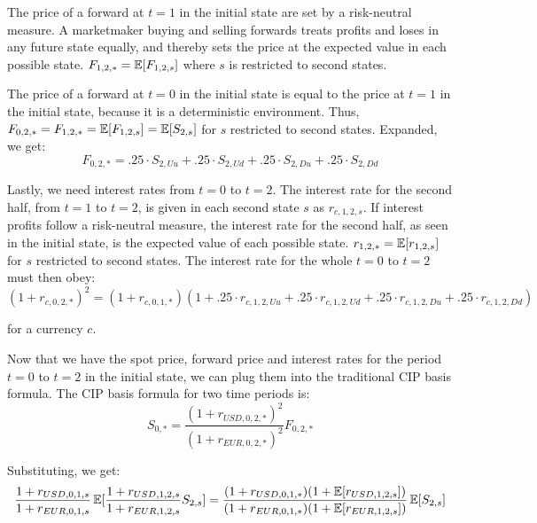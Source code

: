 The price of a forward at $t=1$ in the initial state are set by a risk-neutral measure.  A marketmaker buying and selling forwards treats profits and loses in any future state equally, and thereby sets the price at the expected value in each possible state.  $F_{1,2,*} = \operatorname{\mathbb{E}}[F_{1,2,s}]$ where $s$ is restricted to second states.

The price of a forward at $t=0$ in the initial state is equal to the price at $t=1$ in the initial state, because it is a deterministic environment.  Thus, $F_{0,2,*} = F_{1,2,*} = \operatorname{\mathbb{E}}[F_{1,2,s}] = \operatorname{\mathbb{E}}[S_{2,s}]$ for $s$ restricted to second states.  Expanded, we get:
\begin{equation}
  F_{0,2,*} =. 25\cdot S_{2,Uu} + .25\cdot S_{2,Ud} + .25\cdot S_{2,Du} + .25\cdot S_{2,Dd}
\end{equation}


Lastly, we need interest rates from $t=0$ to $t=2$.  The interest rate for the second half, from $t=1$ to $t=2$, is given in each second state $s$ as $r_{c,1,2,s}$.  If interest profits follow a risk-neutral measure, the interest rate for the second half, as seen in the initial state, is the expected value of each possible state.  $r_{1,2,*} = \operatorname{\mathbb{E}}[r_{1,2,s}]$ for $s$ restricted to second states.  The interest rate for the whole $t=0$ to $t=2$ must then obey:
\begin{equation}
  (1 + r_{c,0,2,*})^2 = (1 + r_{c,0,1,*})(1 + .25\cdot r_{c,1,2,Uu} + .25\cdot r_{c,1,2,Ud} + .25\cdot r_{c,1,2,Du} + .25\cdot r_{c,1,2,Dd})
\end{equation}

\noindent for a currency $c$.

Now that we have the spot price, forward price and interest rates for the period $t=0$ to $t=2$ in the initial state, we can plug them into the traditional CIP basis formula.  The CIP basis formula for two time periods is:
\begin{equation}
  S_{0,*} = \frac{(1 + r_{USD,0,2,*})^2}{(1 + r_{EUR,0,2,*})^2}F_{0,2,*}
\end{equation}

Substituting, we get:
\begin{equation}
  \frac{1+r_{USD,0,1,s}}{1 + r_{EUR,0,1,s}}\operatorname{\mathbb{E}}[\frac{1+r_{USD,1,2,s}}{1 + r_{EUR,1,2,s}} S_{2,s}] = \frac{(1 + r_{USD,0,1,*})(1 +\operatorname{\mathbb{E}}[r_{USD,1,2,s}])}{(1 + r_{EUR,0,1,*})(1 +\operatorname{\mathbb{E}}[r_{EUR,1,2,s}])} \operatorname{\mathbb{E}}[S_{2,s}]
\end{equation}

